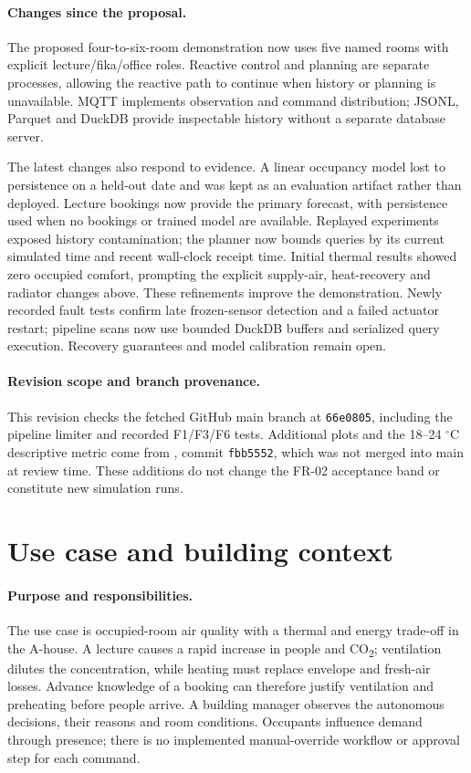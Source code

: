 \documentclass[11pt,a4paper]{article}
\begin{document}
\paragraph{Changes since the proposal.}
The proposed four-to-six-room demonstration now uses five named rooms with explicit lecture/fika/office roles. Reactive control and planning are separate processes, allowing the reactive path to continue when history or planning is unavailable. MQTT implements observation and command distribution; JSONL, Parquet and DuckDB provide inspectable history without a separate database server.

The latest changes also respond to evidence. A linear occupancy model lost to persistence on a held-out date and was kept as an evaluation artifact rather than deployed. Lecture bookings now provide the primary forecast, with persistence used when no bookings or trained model are available. Replayed experiments exposed history contamination; the planner now bounds queries by its current simulated time and recent wall-clock receipt time. Initial thermal results showed zero occupied comfort, prompting the explicit supply-air, heat-recovery and radiator changes above. These refinements improve the demonstration. Newly recorded fault tests confirm late frozen-sensor detection and a failed actuator restart; pipeline scans now use bounded DuckDB buffers and serialized query execution. Recovery guarantees and model calibration remain open.

\paragraph{Revision scope and branch provenance.}
This revision checks the fetched GitHub main branch at \texttt{66e0805}, including the pipeline limiter and recorded F1/F3/F6 tests. Additional plots and the 18--24 $^\circ$C descriptive metric come from \protect{}, commit \texttt{fbb5552}, which was not merged into main at review time. These additions do not change the FR-02 acceptance band or constitute new simulation runs.

\section{Use case and building context}
\paragraph{Purpose and responsibilities.}
The use case is occupied-room air quality with a thermal and energy trade-off in the A-house. A lecture causes a rapid increase in people and CO\textsubscript{2}; ventilation dilutes the concentration, while heating must replace envelope and fresh-air losses. Advance knowledge of a booking can therefore justify ventilation and preheating before people arrive. A building manager observes the autonomous decisions, their reasons and room conditions. Occupants influence demand through presence; there is no implemented manual-override workflow or approval step for each command.
\end{document}
